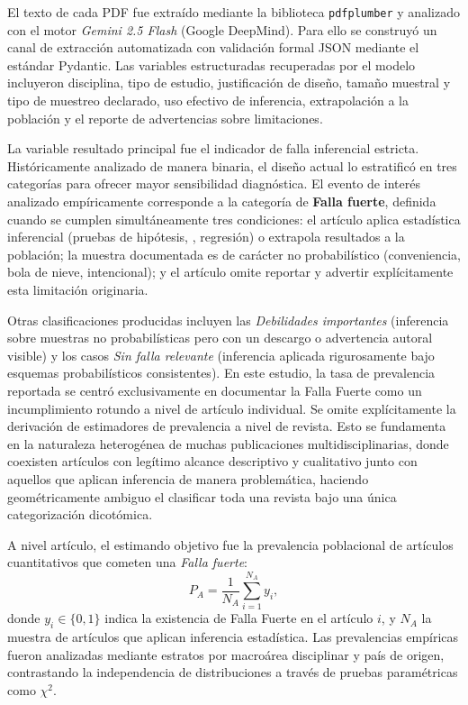 El texto de cada PDF fue extraído mediante la biblioteca \texttt{pdfplumber} y analizado con el motor \textit{Gemini 2.5 Flash} (Google DeepMind). Para ello se construyó un canal de extracción automatizada con validación formal JSON mediante el estándar Pydantic. Las variables estructuradas recuperadas por el modelo incluyeron disciplina, tipo de estudio, justificación de diseño, tamaño muestral y tipo de muestreo declarado, uso efectivo de inferencia, extrapolación a la población y el reporte de advertencias sobre limitaciones.

La variable resultado principal fue el indicador de falla inferencial estricta. Históricamente analizado de manera binaria, el diseño actual lo estratificó en tres categorías para ofrecer mayor sensibilidad diagnóstica. El evento de interés analizado empíricamente corresponde a la categoría de \textbf{Falla fuerte}, definida cuando se cumplen simultáneamente tres condiciones: el artículo aplica estadística inferencial (pruebas de hipótesis, \pvalue, regresión) o extrapola resultados a la población; la muestra documentada es de carácter no probabilístico (conveniencia, bola de nieve, intencional); y el artículo omite reportar y advertir explícitamente esta limitación originaria.

Otras clasificaciones producidas incluyen las \textit{Debilidades importantes} (inferencia sobre muestras no probabilísticas pero con un descargo o advertencia autoral visible) y los casos \textit{Sin falla relevante} (inferencia aplicada rigurosamente bajo esquemas probabilísticos consistentes). En este estudio, la tasa de prevalencia reportada se centró exclusivamente en documentar la Falla Fuerte como un incumplimiento rotundo a nivel de artículo individual. Se omite explícitamente la derivación de estimadores de prevalencia a nivel de revista. Esto se fundamenta en la naturaleza heterogénea de muchas publicaciones multidisciplinarias, donde coexisten artículos con legítimo alcance descriptivo y cualitativo junto con aquellos que aplican inferencia de manera problemática, haciendo geométricamente ambiguo el clasificar toda una revista bajo una única categorización dicotómica.

A nivel artículo, el estimando objetivo fue la prevalencia poblacional de artículos cuantitativos que cometen una \textit{Falla fuerte}:
\[
P_A=\frac{1}{N_A}\sum_{i=1}^{N_A} y_{i},
\]
donde $y_{i} \in \{0,1\}$ indica la existencia de Falla Fuerte en el artículo $i$, y $N_A$ la muestra de artículos que aplican inferencia estadística. Las prevalencias empíricas fueron analizadas mediante estratos por macroárea disciplinar y país de origen, contrastando la independencia de distribuciones a través de pruebas paramétricas como $\chi^2$.

